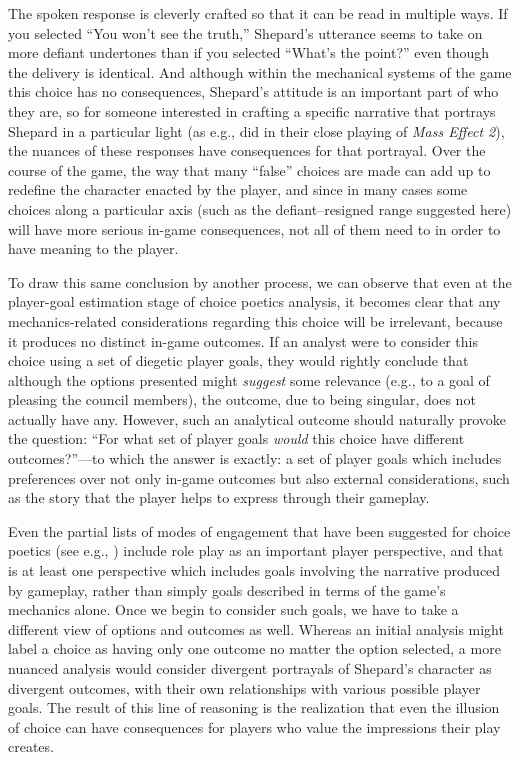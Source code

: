 \documentclass[arts,article,submit,moreauthors,pdftex,10pt,a4paper]{Definitions/mdpi}
\begin{document}
The spoken response is cleverly crafted so that it can be read in multiple ways.
%
If you selected ``You won't see the truth,'' Shepard's utterance seems to take on more defiant undertones than if you selected ``What's the point?'' even though the delivery is identical.
%
And although within the mechanical systems of the game this choice has no consequences, Shepard's attitude is an important part of who they are, so for someone interested in crafting a specific narrative that portrays Shepard in a particular light (as e.g., \cite{bizzocchi2012mass} did in their close playing of \emph{Mass Effect 2}), the nuances of these responses have consequences for that portrayal.
%
Over the course of the game, the way that many ``false'' choices are made can add up to redefine the character enacted by the player, and since in many cases some choices along a particular axis (such as the defiant--resigned range suggested here) will have more serious in-game consequences, not all of them need to in order to have meaning to the player.


To draw this same conclusion by another process, we can observe that even at the player-goal estimation stage of choice poetics analysis, it becomes clear that any mechanics-related considerations regarding this choice will be irrelevant, because it produces no distinct in-game outcomes.
%
If an analyst were to consider this choice using a set of diegetic player goals, they would rightly conclude that although the options presented might \emph{suggest} some relevance (e.g., to a goal of pleasing the council members), the outcome, due to being singular, does not actually have any.
%
However, such an analytical outcome should naturally provoke the question: ``For what set of player goals \emph{would} this choice have different outcomes?''---to which the answer is exactly: a set of player goals which includes preferences over not only in-game outcomes but also external considerations, such as the story that the player helps to express through their gameplay.


Even the partial lists of modes of engagement that have been suggested for choice poetics (see e.g., \cite{mawhorter2014towards}) include role play as an important player perspective, and that is at least one perspective which includes goals involving the narrative produced by gameplay, rather than simply goals described in terms of the game's mechanics alone.
%
Once we begin to consider such goals, we have to take a different view of options and outcomes as well.
%
Whereas an initial analysis might label a choice as having only one outcome no matter the option selected, a more nuanced analysis would consider divergent portrayals of Shepard's character as divergent outcomes, with their own relationships with various possible player goals.
%
The result of this line of reasoning is the realization that even the illusion of choice can have consequences for players who value the impressions their play creates.
\end{document}
